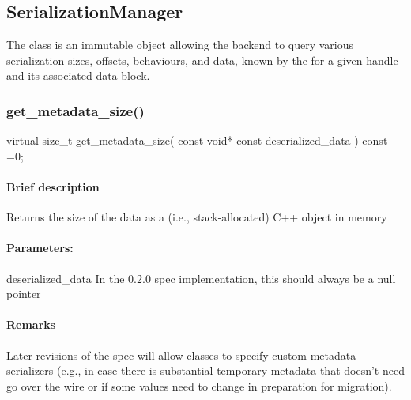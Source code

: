 \subsection{{SerializationManager}}
The class  is an immutable object allowing the backend to query various serialization sizes, offsets,
   behaviours, and data, known by the for a given handle and its associated data block.


\subsubsection{get\_metadata\_size()}
\begin{CppCode}
    virtual size_t
    get_metadata_size(
      const void* const deserialized_data
    ) const =0;
\end{CppCode}

\paragraph{Brief description} Returns the size of the data as a (i.e., stack-allocated) C++ object in memory
     
\paragraph{Parameters:}
\begin{compactdesc} 
\item[deserialized\_data] In the 0.2.0 spec implementation, this should always be a null pointer
\end{compactdesc}

\paragraph{Remarks} Later revisions of the spec will allow classes to specify custom metadata serializers
       (e.g., in case there is substantial temporary metadata that doesn't need go over the wire or
       if some values need to change in preparation for migration).

